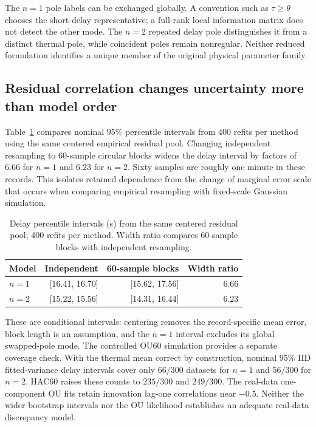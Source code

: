 \documentclass[11pt]{article}
\begin{document}


The $n=1$ pole labels can be exchanged globally. A convention such as
$\tau\geq\theta$ chooses the short-delay representative; a full-rank local
information matrix does not detect the other mode. The $n=2$ repeated delay pole
distinguishes it from a distinct thermal pole, while coincident poles remain
nonregular. Neither reduced formulation identifies a unique member of the
original physical parameter family.

\subsection{Residual correlation changes uncertainty more than model order}
Table~\ref{tab:teaching-blocks} compares nominal $95\%$ percentile intervals
from $400$ refits per method using the same centered empirical residual pool.
Changing independent resampling to $60$-sample circular blocks widens the delay
interval by factors of $6.66$ for $n=1$ and $6.23$ for $n=2$. Sixty samples
are roughly one minute in these records. This isolates retained dependence
from the change of marginal error scale that occurs when comparing empirical
resampling with fixed-scale Gaussian simulation.

\begin{table}[htbp]
\centering
\small
\caption{Delay percentile intervals (s) from the same centered residual pool; 400 refits per method. Width ratio compares 60-sample blocks with independent resampling.}
\label{tab:teaching-blocks}
\begin{tabular}{lrrr}
\toprule
Model & Independent & 60-sample blocks & Width ratio \\
\midrule
$n=1$ & [16.41, 16.70] & [15.62, 17.56] & 6.66 \\
$n=2$ & [15.22, 15.56] & [14.31, 16.44] & 6.23 \\
\bottomrule
\end{tabular}
\end{table}



These are conditional intervals: centering removes the record-specific mean
error, block length is an assumption, and the $n=1$ interval excludes its global
swapped-pole mode. The controlled OU60 simulation provides a separate coverage
check. With the thermal mean correct by construction, nominal $95\%$
IID fitted-variance delay intervals cover only $66/300$ datasets for $n=1$
and $56/300$ for $n=2$. HAC60 raises these counts to $235/300$ and $249/300$.
The real-data one-component OU fits retain innovation lag-one correlations near
$-0.5$. Neither the wider bootstrap intervals nor the OU likelihood establishes
an adequate real-data discrepancy model.
\end{document}

